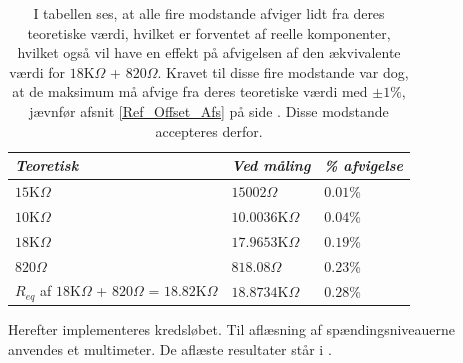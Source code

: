 \begin{table}[H]
	\centering
	\begin{tabular}{|l|l|l|}
		\hline
		\textit{Teoretisk} & \textit{Ved måling} & \textit{\% afvigelse} \\ \hline
		$15$K$\Omega$       & $15002\Omega$      & $0.01$\%               \\ \hline
		$10$K$\Omega$       & $10.0036$K$\Omega$ & $0.04$\%               \\ \hline
		$18$K$\Omega$       & $17.9653$K$\Omega$ & $0.19$\%               \\ \hline		
		$820\Omega$         & $818.08\Omega$     & $0.23$\%               \\ \hline
		$R_{eq}$ af $18$K$\Omega$ + $820\Omega$ = $18.82$K$\Omega$ & $18.8734$K$\Omega$ & $0.28\%$ \\ \hline
	\end{tabular}
	\caption{I tabellen ses, at alle fire modstande afviger lidt fra deres teoretiske værdi, hvilket er forventet af reelle komponenter, hvilket også vil have en effekt på afvigelsen af den ækvivalente værdi for $18$K$\Omega$ + $820\Omega$. Kravet til disse fire modstande var dog, at de maksimum må afvige fra deres teoretiske værdi med $\pm1\%$, jævnfør afsnit \ref{Ref_Offset_Afs} på side \pageref{Ref_Offset_Afs}. Disse modstande accepteres derfor.}
	\label{Tab:modstand_offset}
\end{table}
\noindent Herefter implementeres kredsløbet. Til aflæsning af spændingsniveauerne anvendes et multimeter. De aflæste resultater står i .
